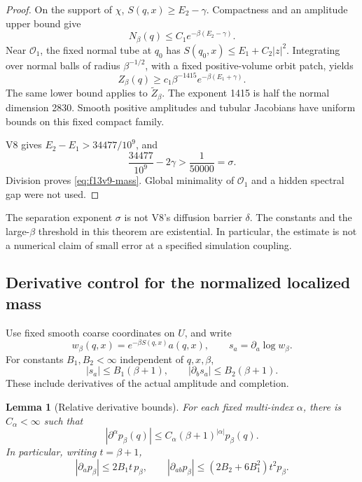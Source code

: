 \documentclass[11pt,oneside]{article}
\newtheorem{lemma}[theorem]{Lemma}
\begin{document}
\begin{proof}
On the support of \(\chi\),
\(S(q,x)\ge E_2-\gamma\).
Compactness and an amplitude upper
bound give
\[
 N_\beta(q)\le C_1e^{-\beta(E_2-\gamma)}.
\]
Near \(\mathcal O_1\), the fixed
normal tube at \(q_0\) has
\(S(q_0,x)\le E_1+C_2|z|^2\).
Integrating over normal balls of
radius \(\beta^{-1/2}\), with a fixed
positive-volume orbit patch, yields
\[
 Z_\beta(q)\ge c_1\beta^{-1415}
                        e^{-\beta(E_1+\gamma)}.
\]
The same lower bound applies to
\(\widetilde Z_\beta\). The exponent
1415 is half the normal dimension
2830. Smooth positive amplitudes and
tubular Jacobians have uniform bounds
on this fixed compact family.

V8 gives \(E_2-E_1>34477/10^9\), and
\[
 \frac{34477}{10^9}-2\gamma
       >\frac1{50000}=\sigma .
\]
Division proves \eqref{eq:f13v9-mass}.
Global minimality of \(\mathcal O_1\)
and a hidden spectral gap were not
used.
\end{proof}

The separation exponent \(\sigma\)
is not V8's diffusion barrier
\(\delta\). The constants and the
large-\(\beta\) threshold in this
theorem are existential. In particular,
the estimate is not a numerical
claim of small error at a specified
simulation coupling.

\subsection{Derivative control for the normalized localized mass}

Use fixed smooth coarse coordinates
on \(U\), and write
\[
 w_\beta(q,x)=e^{-\beta S(q,x)}a(q,x),
 \qquad
 s_a=\partial_a\log w_\beta .
\]
For constants \(B_1,B_2<\infty\)
independent of \(q,x,\beta\),
\[
 |s_a|\le B_1(\beta+1),\qquad
 |\partial_bs_a|\le B_2(\beta+1).
\]
These include derivatives of the
actual amplitude and completion.

\begin{lemma}[Relative derivative bounds]
\label{lem:f13v9-relative}
For each fixed multi-index \(\alpha\),
there is \(C_\alpha<\infty\) such that
\[
 |\partial^\alpha p_\beta(q)|
 \le C_\alpha(\beta+1)^{|\alpha|}p_\beta(q).
\]
In particular, writing \(t=\beta+1\),
\[
 |\partial_ap_\beta|\le2B_1t\,p_\beta,\qquad
 |\partial_{ab}p_\beta|
       \le(2B_2+6B_1^2)t^2p_\beta .
\]
\end{lemma}
\end{document}
